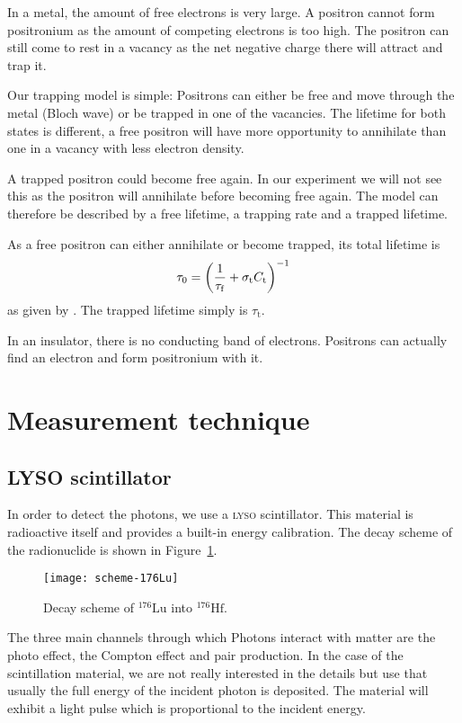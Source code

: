 \documentclass[11pt, english, fleqn, DIV=15, headinclude, BCOR=2cm]{scrreprt}
\begin{document}
In a metal, the amount of free electrons is very large. A positron cannot form
positronium as the amount of competing electrons is too high. The positron can
still come to rest in a vacancy as the net negative charge there will attract
and trap it.

Our trapping model is simple: Positrons can either be free and move through the
metal (Bloch wave) or be trapped in one of the vacancies. The lifetime for both
states is different, a free positron will have more opportunity to annihilate
than one in a vacancy with less electron density.

A trapped positron could become free again. In our experiment we will not see
this as the positron will annihilate before becoming free again. The model can
therefore be described by a free lifetime, a trapping rate and a trapped
lifetime.

As a free positron can either annihilate or become trapped, its total lifetime
is
\[
    \tau_0 = \left( \frac{1}{\tau_\mathrm f} + \sigma_\mathrm t C_\mathrm t \right)^{-1}
\]
as given by \textcite[(1a)]{Weiler/Vacancy_formation}. The trapped lifetime
simply is $\tau_\mathrm t$.

In an insulator, there is no conducting band of electrons. Positrons can
actually find an electron and form positronium with it. 

\section{Measurement technique}

\subsection{LYSO scintillator}

In order to detect the photons, we use a \textsc{lyso} scintillator. This material is
radioactive itself and provides a built-in energy calibration. The decay scheme
of the radionuclide is shown in Figure~\ref{fig:scheme-176Lu}.

\begin{figure}
    \centering
    \texttt{[image: scheme-176Lu]}
    \caption{%
        Decay scheme of $^{176}\mathrm{Lu}$ into $^{176}\mathrm{Hf}$.
    }
    \label{fig:scheme-176Lu}
\end{figure}

The three main channels through which Photons interact with matter are the
photo effect, the Compton effect and pair production. In the case of the
scintillation material, we are not really interested in the details but use
that usually the full energy of the incident photon is deposited. The material
will exhibit a light pulse which is proportional to the incident energy.
\end{document}
